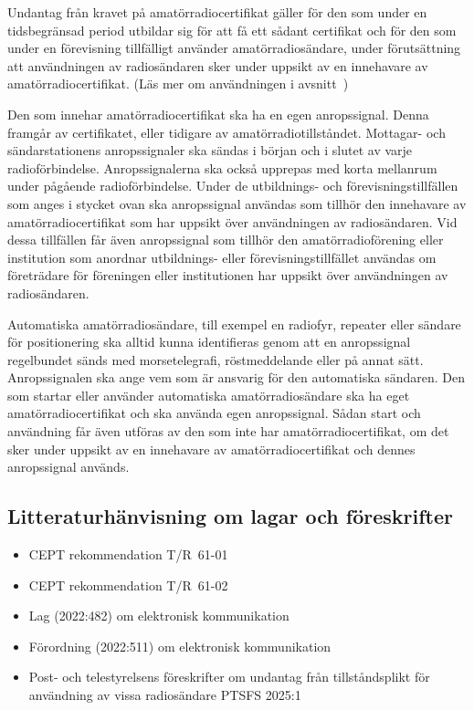 Undantag från kravet på amatörradiocertifikat gäller för den som under en
tidsbegränsad period utbildar sig för att få ett sådant certifikat och för den
som under en förevisning tillfälligt använder amatörradiosändare, under
förutsättning att användningen av radiosändaren sker under uppsikt av en
innehavare av amatörradiocertifikat.
(Läs mer om användningen i avsnitt~)

Den som innehar amatörradiocertifikat ska ha en egen anropssignal.
Denna framgår av certifikatet, eller tidigare av amatörradiotillståndet.
Mottagar- och sändarstationens anropssignaler ska sändas i början och i
slutet av varje radioförbindelse.
Anropssignalerna ska också upprepas med korta mellanrum under pågående
radioförbindelse. Under de utbildnings- och förevisningstillfällen som anges i
stycket ovan ska anropssignal användas som tillhör den innehavare av
amatörradiocertifikat som har uppsikt över användningen av radiosändaren.
Vid dessa tillfällen får även anropssignal som tillhör den amatörradioförening
eller institution som anordnar utbildnings- eller förevisningstillfället
användas om företrädare för föreningen eller institutionen har uppsikt över
användningen av radiosändaren.

Automatiska amatörradiosändare, till exempel en radiofyr, repeater eller
sändare för positionering ska alltid kunna identifieras genom att en
anropssignal regelbundet sänds med morsetelegrafi, röstmeddelande eller
på annat sätt.
Anropssignalen ska ange vem som är ansvarig för den automatiska sändaren.
Den som startar eller använder automatiska amatörradiosändare ska ha eget
amatörradiocertifikat och ska använda egen anropssignal.
Sådan start och användning får även utföras av den som inte har
amatörradiocertifikat, om det sker under uppsikt av en innehavare av
amatörradiocertifikat och dennes anropssignal används.

\subsection{Litteraturhänvisning om lagar och föreskrifter}

\begin{itemize}
\item CEPT rekommendation T/R~61-01~\cite{TR6101}
\item CEPT rekommendation T/R~61-02~\cite{TR6102}
\item Lag (2022:482) om elektronisk kommunikation~\cite{SFS2022:482}
\item Förordning (2022:511) om elektronisk kommunikation~\cite{SFS2022:511}
\item Post- och telestyrelsens föreskrifter om undantag från tillståndsplikt för
användning av vissa radiosändare PTSFS 2025:1~\cite{PTSFS2025:1}
\end{itemize}

